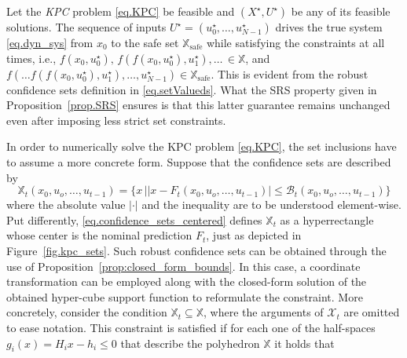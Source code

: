 Let the \emph{KPC} problem \eqref{eq.KPC} be feasible and $(X^\star,U^\star)$ be any of its feasible solutions. The sequence of inputs $U^\star = (u_0^\star, \dots, u_{N-1}^\star)$ drives the true system \eqref{eq.dyn_sys} from $x_0$ to the safe set $\mathbb{X}_{\text{safe}}$ while satisfying the constraints at all times, i.e., $f(x_0,u_0^\star), \, f(f(x_0,u_0^\star),u_1^\star), \dots \, \in \mathbb{X}$, and $f(\dots f(f(x_0,u_0^\star),u_1^\star),\dots,u_{N-1}^\star) \in \mathbb{X}_{\text{safe}}$. This is evident from the robust confidence sets definition in \eqref{eq.setValueds}. What the SRS property given in Proposition~\ref{prop.SRS} ensures is that this latter guarantee remains unchanged even after imposing less strict set constraints. 

In order to numerically solve the KPC problem \eqref{eq.KPC}, the set inclusions have to assume a more concrete form. Suppose that the confidence sets are described by
\begin{equation}
	\mathbb{X}_t(x_0,u_o,\dots,u_{t-1}) = \{ x \, | \vert x - F_t(x_0,u_o,\dots,u_{t-1}) \vert \leq \mathcal{B}_t(x_0,u_o,\dots,u_{t-1}) \}
	\label{eq.confidence_sets_centered}
\end{equation} 
where the absolute value $|\cdot|$ and the inequality are to be understood element-wise. Put differently, \eqref{eq.confidence_sets_centered} defines $\mathbb{X}_t$ as a hyperrectangle whose center is the nominal prediction $F_t$, just as depicted in Figure~\ref{fig.kpc_sets}. Such robust confidence sets can be obtained through the use of Proposition~\ref{prop:closed_form_bounds}. In this case, a coordinate transformation can be employed along with the closed-form solution of the obtained hyper-cube support function to reformulate the constraint. More concretely, consider the condition $\mathbb{X}_t \subseteq \mathbb{X}$, where the arguments of $\mathcal{X}_t$ are omitted to ease notation. This constraint is satisfied if for each one of the half-spaces $g_i(x) = H_i x - h_i \leq 0$ that describe the polyhedron $\mathbb{X}$ it holds that
%
